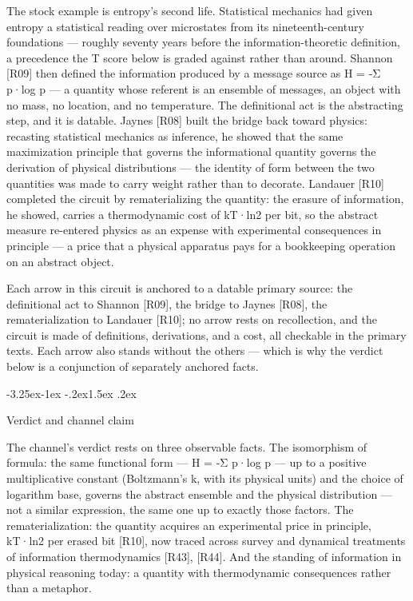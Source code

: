 \documentclass[11pt,a4paper]{article}
\makeatletter
\renewcommand\subsection{\@startsection{subsection}{2}{\z@}%
  {-3.25ex\@plus -1ex \@minus -.2ex}{1.5ex \@plus .2ex}%
  {\normalfont\large\bfseries\raggedright}}
\makeatother
\begin{document}
The stock example is entropy's second life. Statistical mechanics had given entropy a statistical reading over microstates from its nineteenth-century foundations — roughly seventy years before the information-theoretic definition, a precedence the T score below is graded against rather than around. Shannon [R09] then defined the information produced by a message source as H = -Σ p·log p — a quantity whose referent is an ensemble of messages, an object with no mass, no location, and no temperature. The definitional act is the abstracting step, and it is datable. Jaynes [R08] built the bridge back toward physics: recasting statistical mechanics as inference, he showed that the same maximization principle that governs the informational quantity governs the derivation of physical distributions — the identity of form between the two quantities was made to carry weight rather than to decorate. Landauer [R10] completed the circuit by rematerializing the quantity: the erasure of information, he showed, carries a thermodynamic cost of kT·ln2 per bit, so the abstract measure re-entered physics as an expense with experimental consequences in principle — a price that a physical apparatus pays for a bookkeeping operation on an abstract object.

Each arrow in this circuit is anchored to a datable primary source: the definitional act to Shannon [R09], the bridge to Jaynes [R08], the rematerialization to Landauer [R10]; no arrow rests on recollection, and the circuit is made of definitions, derivations, and a cost, all checkable in the primary texts. Each arrow also stands without the others — which is why the verdict below is a conjunction of separately anchored facts.

\subsection{Verdict and channel claim}

The channel's verdict rests on three observable facts. The isomorphism of formula: the same functional form — H = -Σ p·log p — up to a positive multiplicative constant (Boltzmann's k, with its physical units) and the choice of logarithm base, governs the abstract ensemble and the physical distribution — not a similar expression, the same one up to exactly those factors. The rematerialization: the quantity acquires an experimental price in principle, kT·ln2 per erased bit [R10], now traced across survey and dynamical treatments of information thermodynamics [R43], [R44]. And the standing of information in physical reasoning today: a quantity with thermodynamic consequences rather than a metaphor.
\end{document}
